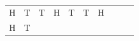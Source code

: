 {\begin{tabular}[t]{|l|l|l|l|l|l|l|l|l|l|}
        H &
    
    
        T &
    
    
        T &
    
    
        H &
    
    
        T &
    
    
        T &
    
    
        H%
     \tabularnewline\cline{1-1}\cline{2-2}\cline{3-3}\cline{4-4}\cline{5-5}\cline{6-6}\cline{7-7}\cline{8-8}\cline{9-9}\cline{10-10}
    
    
        H &
    
    
        T &
    

\end{tabular}}
